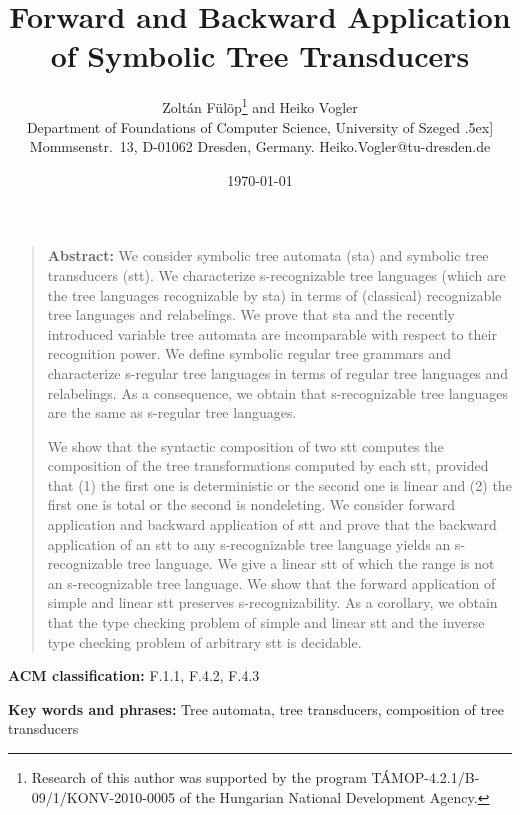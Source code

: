 \documentclass[10pt]{scrartcl}
\def\-{}
\begin{document}
\title{Forward and Backward Application of Symbolic Tree Transducers}

\author{Zolt\'an F\"ul\"op\thanks{Research of this author was supported by the program T\'AMOP-4.2.1/B-09/1/KONV-2010-0005  of the Hungarian National
    Development Agency.} and Heiko Vogler\\
  {\small  Department of Foundations of Computer Science,
    University of Szeged} \-.5ex]
  {\small Mommsenstr.~13, D-01062 Dresden, Germany.
    {Heiko.Vogler@tu-dresden.de}}}

\date{\today}

\maketitle

\sloppy


\begin{quote}{\bf Abstract:} We consider symbolic tree automata (sta) and symbolic tree transducers (stt). We characterize s-recognizable tree languages (which are the tree languages recognizable by sta) in terms of (classical) recognizable tree languages and relabelings. We prove that sta and the recently introduced variable tree automata are incomparable with respect to their recognition power.  We define symbolic regular tree grammars and characterize s-regular tree languages in terms of regular tree languages and relabelings. As a consequence, we obtain that s-recognizable tree languages are the same as s-regular tree languages.

We show that  the syntactic composition of two stt computes the composition of
the tree transformations computed by each stt, provided that (1) the first one is deterministic or the second one is linear and (2) the first one is total or the second is nondeleting.  We consider forward application and backward application of stt and prove  that the backward application of an stt to any s-recognizable tree language yields an s-recognizable tree language. We give a linear stt of which the range is not an s-recognizable tree language. We show that the  forward application of simple and linear stt preserves s-recognizability. As a corollary, we obtain  that the type checking problem of simple and linear stt and the inverse type checking problem of arbitrary stt is decidable.
\end{quote}


{\bf ACM classification:} F.1.1, F.4.2, F.4.3

{\bf Key words and phrases:} Tree automata, tree transducers, composition of tree transducers
\end{document}
